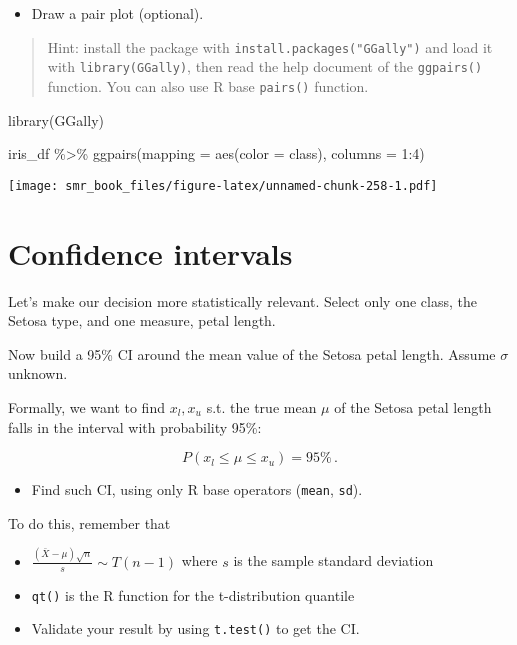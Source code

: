 \documentclass[
  oneside]{book}
\newenvironment{Shaded}{\begin{snugshade}}{\end{snugshade}}
\newcommand{\AttributeTok}[1]{\textcolor[rgb]{0.77,0.63,0.00}{#1}}
\newcommand{\DecValTok}[1]{\textcolor[rgb]{0.00,0.00,0.81}{#1}}
\newcommand{\FunctionTok}[1]{\textcolor[rgb]{0.00,0.00,0.00}{#1}}
\newcommand{\NormalTok}[1]{#1}
\newcommand{\SpecialCharTok}[1]{\textcolor[rgb]{0.00,0.00,0.00}{#1}}
\providecommand{\tightlist}{%
  \setlength{\itemsep}{0pt}\setlength{\parskip}{0pt}}
\begin{document}
\begin{itemize}
\tightlist
\item
  Draw a pair plot (optional).
\end{itemize}

\begin{quote}
Hint: install the package with \texttt{install.packages("GGally")} and load it with \texttt{library(GGally)}, then
read the help document of the \texttt{ggpairs()} function. You can also use R base \texttt{pairs()} function.
\end{quote}

\begin{Shaded}
\begin{Highlighting}[]
\FunctionTok{library}\NormalTok{(GGally)}

\NormalTok{iris\_df }\SpecialCharTok{\%\textgreater{}\%}
  \FunctionTok{ggpairs}\NormalTok{(}\AttributeTok{mapping =} \FunctionTok{aes}\NormalTok{(}\AttributeTok{color =}\NormalTok{ class), }\AttributeTok{columns =} \DecValTok{1}\SpecialCharTok{:}\DecValTok{4}\NormalTok{)}
\end{Highlighting}
\end{Shaded}

\texttt{[image: smr\_book\_files/figure-latex/unnamed-chunk-258-1.pdf]}

\hypertarget{confidence-intervals-1}{%
\section{Confidence intervals}\label{confidence-intervals-1}}

Let's make our decision more statistically relevant.
Select only one class, the Setosa type, and one measure, petal length.

Now build a 95\% CI around the mean value of the Setosa petal length.
Assume \(\sigma\) unknown.

Formally, we want to find \(x_l, x_u\) s.t. the true mean \(\mu\)
of the Setosa petal length falls in the interval with probability 95\%:

\[
P(x_l \leq \mu \leq x_u) = 95\%\,.
\]

\begin{itemize}
\tightlist
\item
  Find such CI, using only R base operators (\texttt{mean}, \texttt{sd}).
\end{itemize}

To do this, remember that

\begin{itemize}
\item
  \(\frac{(\bar{X} - \mu)\sqrt{n}}{s} \sim T(n-1)\) where \(s\) is the sample standard deviation
\item
  \texttt{qt()} is the R function for the t-distribution quantile
\item
  Validate your result by using \texttt{t.test()} to get the CI.
\end{itemize}
\end{document}
